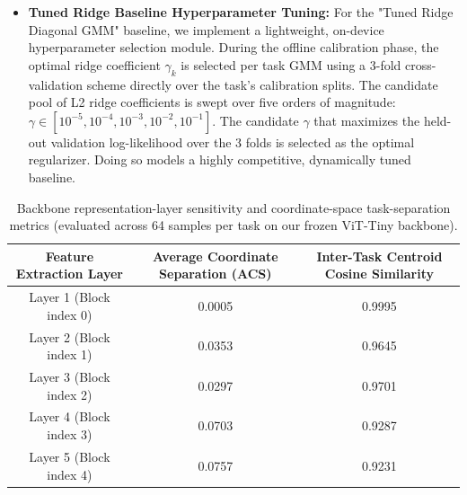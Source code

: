 \begin{itemize}
    \item {\bf Tuned Ridge Baseline Hyperparameter Tuning:} For the "Tuned Ridge Diagonal GMM" baseline, we implement a lightweight, on-device hyperparameter selection module. During the offline calibration phase, the optimal ridge coefficient $\gamma_k$ is selected per task GMM using a 3-fold cross-validation scheme directly over the task's calibration splits. The candidate pool of L2 ridge coefficients is swept over five orders of magnitude: $\gamma \in [10^{-5}, 10^{-4}, 10^{-3}, 10^{-2}, 10^{-1}]$. The candidate $\gamma$ that maximizes the held-out validation log-likelihood over the 3 folds is selected as the optimal regularizer. Doing so models a highly competitive, dynamically tuned baseline.
\end{itemize}

\begin{table}[h]
\caption{Backbone representation-layer sensitivity and coordinate-space task-separation metrics (evaluated across 64 samples per task on our frozen ViT-Tiny backbone).}
\label{submission:tab:layer_sensitivity}
\vskip 0.15in
\begin{center}
\begin{small}
\begin{tabular}{ccc}
\toprule
{\bf Feature Extraction Layer} & {\bf Average Coordinate Separation (ACS)} & {\bf Inter-Task Centroid Cosine Similarity} \\
\midrule
Layer 1 (Block index 0) & 0.0005 & 0.9995 \\
Layer 2 (Block index 1) & 0.0353 & 0.9645 \\
Layer 3 (Block index 2) & 0.0297 & 0.9701 \\
Layer 4 (Block index 3) & 0.0703 & 0.9287 \\
Layer 5 (Block index 4) & 0.0757 & 0.9231 \\
\bottomrule
\end{tabular}
\end{small}
\end{center}
\vskip -0.1in
\end{table}

